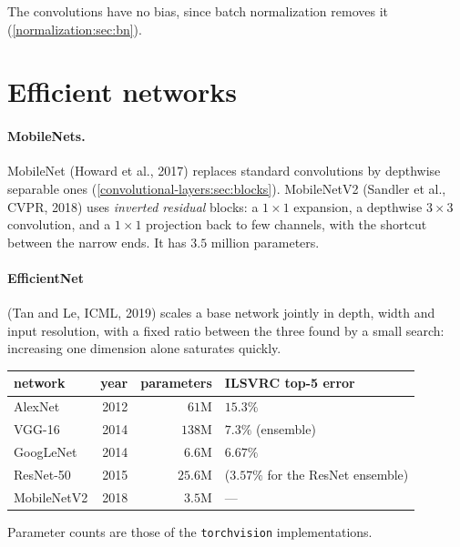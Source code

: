 \begin{notechapter}
The convolutions have no bias, since batch normalization removes it
(\cref{normalization:sec:bn}).

\section{Efficient networks}\label{cnn-architectures:sec:efficient}

\paragraph{MobileNets.} MobileNet (Howard et al., 2017) replaces standard convolutions by
depthwise separable ones (\cref{convolutional-layers:sec:blocks}). MobileNetV2 (Sandler et
al., CVPR, 2018) uses \emph{inverted residual} blocks: a $1\times1$ expansion, a depthwise $3\times3$ convolution,
and a $1\times1$ projection back to few channels, with the shortcut between the narrow ends. It has
$3.5$ million parameters.

\paragraph{EfficientNet} (Tan and Le, ICML, 2019) scales a base network jointly in depth,
width and input resolution, with a fixed ratio between the three found by a small search:
increasing one dimension alone saturates quickly.

\begin{center}
\begin{tabular}{lrrl}
\toprule
network & year & parameters & ILSVRC top-5 error \\
\midrule
AlexNet & 2012 & $61$M & $15.3\%$ \\
VGG-16 & 2014 & $138$M & $7.3\%$ (ensemble) \\
GoogLeNet & 2014 & $6.6$M & $6.67\%$ \\
ResNet-50 & 2015 & $25.6$M & ($3.57\%$ for the ResNet ensemble) \\
MobileNetV2 & 2018 & $3.5$M & --- \\
\bottomrule
\end{tabular}
\end{center}

Parameter counts are those of the \texttt{torchvision} implementations.


\end{notechapter}
